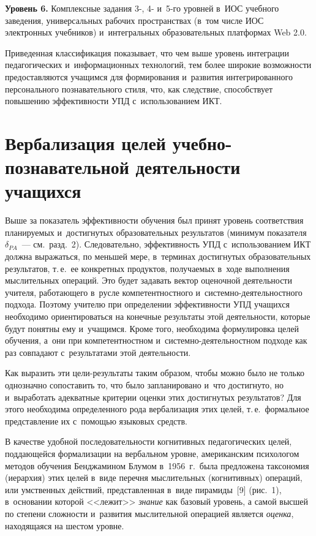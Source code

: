 \begin{multicols}{2}
\smallskip

  \textbf{Уровень 6.} Комплексные задания 3-, 4- и~5-го уровней в~ИОС учебного заведения,
универсальных рабочих пространствах (в~том числе ИОС электронных учебников)
и~интегральных образовательных платформах Web 2.0.

  \medskip

   Приведенная классификация показывает, что чем выше уровень интеграции педагогических
и~информационных технологий, тем более широкие возможности предоставляются учащимся
для формирования и~развития интегрированного персонального познавательного стиля, что, как
следствие, способствует повышению эффективности УПД с~использованием ИКТ.

\vspace*{-6pt}

\section{Вербализация целей учебно-познавательной деятельности учащихся}

  Выше  за показатель эф\-фек\-тив\-ности обучения был принят уровень соответствия
планируемых и~достигнутых образовательных результатов (минимум показателя
$\delta_{PA}$~--- см.\ разд.~2). Следовательно, эффективность УПД с~использованием ИКТ
должна выражаться, по меньшей мере, в~терминах достигнутых образовательных результатов,
т.\,е.\ ее конкретных продуктов, получаемых в~ходе выполнения мыслительных операций. Это
будет задавать вектор оценочной деятельности учителя, ра\-бо\-та\-юще\-го в~русле
компетентностного и~сис\-тем\-но-де\-я\-тель\-ност\-но\-го подхода.
%
  Поэтому учителю при определе\-нии эффективности УПД учащихся необходимо
ориентироваться на конечные результаты этой деятельности, которые будут понятны ему
и~учащимся. Кроме того, необходима формулировка целей обучения, а~они при
компетентностном и~сис\-тем\-но-де\-я\-тель\-ност\-ном подходе как раз совпадают
с~результатами этой деятельности.

  Как выразить эти цели-результаты таким образом, чтобы можно было не только
однозначно сопоставить то, что было запланировано и~что достигнуто, но и~выработать
адекватные критерии оценки этих достигнутых результатов? Для этого необходима
определенного рода вербализация этих целей, т.\,е.\ формальное представление их
с~по\-мощью языковых средств.

  В качестве удобной последовательности когнитивных педагогических целей, поддающейся
формализации на вербальном уровне, американским психологом методов обучения
Бенджамином Блумом в~1956~г.\ была предложена таксономия (иерархия) этих целей в~виде
перечня мыслительных (когнитивных) операций, или умственных действий, представленная
в~виде пирамиды~[9] (рис.~1), в~основании которой <<лежит>> \textit{знание} как базовый
уровень, а самой высшей по степени сложности и~развития мыслительной операцией является
\textit{оценка}, находящаяся на шестом уровне.



\end{multicols}
